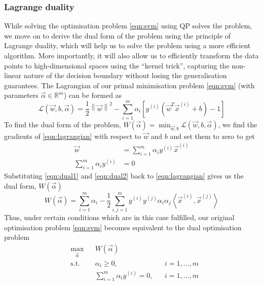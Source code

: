 \subsubsection{Lagrange duality}
	While solving the optimisation problem \eqref{eqn:svm} using QP solves the problem, we move on to derive the dual form of the problem using the principle of Lagrange duality, which will help us to solve the problem using a more efficient algorithm. More importantly, it will also allow us to efficiently transform the data points to high-dimensional spaces using the ``kernel trick'', capturing the non-linear nature of the decision boundary without losing the generalisation guarantees. The Lagrangian of our primal minimisation problem \eqref{eqn:svm} (with parameters $\vec{\alpha} \in \mathbb{R}^m$) can be formed as
	\begin{equation}
		\mathcal{L}(\vec{w}, b, \vec{\alpha}) = \frac{1}{2} \left\| \vec{w} \right\|^2 - \sum_{i=1}^{m} \alpha_i \left[ y^{(i)}\left( \vec{w}^T \vec{x}^{(i)} + b \right) - 1 \right]
	\label{eqn:lagrangian}
	\end{equation}
To find the dual form of the problem, $W(\vec{\alpha}) = \min_{\vec{w}, b} \mathcal{L}(\vec{w}, b, \vec{\alpha})$, we find the gradients of \eqref{eqn:lagrangian} with respect to $\vec{w}$ and $b$ and set them to zero to get
	\begin{align}
		\vec{w} 					& = \sum_{i = 1}^{m} \alpha_i y^{(i)} \vec{x}^{(i)} \label{eqn:dual1}\\
		\sum_{i = 1}^{m} \alpha_i y^{(i)}	& = 0 \label{eqn:dual2}
	\end{align}
Substituting \eqref{eqn:dual1} and \eqref{eqn:dual2} back to \eqref{eqn:lagrangian} gives us the dual form, $W(\vec{\alpha})$
	\begin{equation}
		W(\vec{\alpha}) = \sum_{i = 1}^{m} \alpha_i - \frac{1}{2} \sum_{i, j = 1}^{m} y^{(i)} y^{(j)} \alpha_i \alpha_j \left\langle \vec{x}^{(i)}, \vec{x}^{(j)} \right\rangle
		\label{eqn:dualForm}
	\end{equation}
Thus, under certain conditions which are in this case fulfilled, our original optimisation problem \eqref{eqn:svm} becomes equivalent to the dual optimisation problem
	\begin{equation}
	\begin{aligned}
		& \max_{\vec\alpha}
		& & W(\vec{\alpha}) \\
		& \text{s.t.}
		& & \alpha_i \geq 0, & &  i = 1, \dotsc, m \\
		& & & \sum_{i = 1}^{m} \alpha_i y^{(i)} = 0, & &  i = 1, \dotsc, m
	\label{eqn:dualOpt}
	\end{aligned}
	\end{equation}

